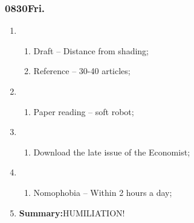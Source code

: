 \subsubsection{0830Fri.}
\begin{enumerate}
	\item \ncquaone
	\begin{enumerate}[(1)]
		\item Draft -- Distance from shading;\rightundoneBlack
		\item Reference -- 30-40 articles;\rightundoneBlack
	\end{enumerate}
	
	\item \ncquatwo	
	\begin{enumerate}[(1)]
		\item Paper reading -- soft robot;\rightundoneBlack
	\end{enumerate}
	
	\item \ncquathree
	\begin{enumerate}[(1)]
		\item Download the late issue of the Economist;\rightundoneBlack
	\end{enumerate}
	
	\item \ncquafour	
	\begin{enumerate}[(1)]
		\item Nomophobia -- Within 2 hours a day;\rightundoneBlack
	\end{enumerate}
	\item \textbf{Summary:}HUMILIATION! 
\end{enumerate}
